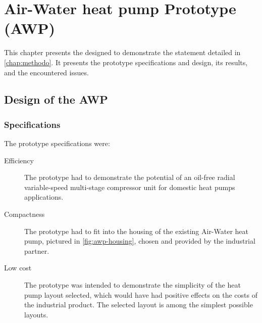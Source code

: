 \chapter{Air-Water heat pump Prototype (AWP)}
\label{chap:awp}
\resetallacronyms

\begin{shaded}
  This chapter presents the \AWP{} designed to demonstrate the
  statement detailed in \cref{chap:methodo}. It presents the prototype
  specifications and design, its results, and the encountered issues.
\end{shaded}

\section{Design of the AWP}
\label{sec:awp-design}

\subsection{Specifications}
\label{sec:awp-specs}

The prototype specifications were:
\begin{description}
\item[Efficiency] The prototype had to demonstrate the potential of an
  oil-free radial variable-speed multi-stage compressor unit for
  domestic heat pumps applications.
\item[Compactness] The prototype had to fit into the housing of the
  existing Air-Water heat pump, pictured in \cref{fig:awp-housing},
  chosen and provided by the industrial partner.
\item[Low cost] The prototype was intended to demonstrate the
  simplicity of the heat pump layout selected, which would have had
  positive effects on the costs of the industrial
  product. The selected layout is among the simplest
  possible layouts.
\end{description}


